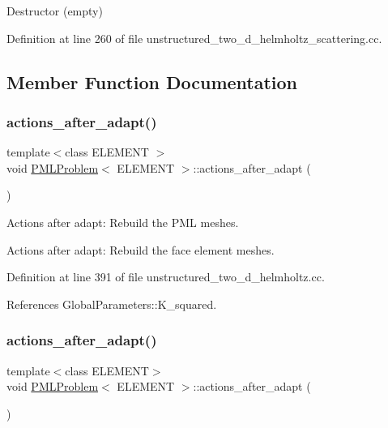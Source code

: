 Destructor (empty) 



Definition at line 260 of file unstructured\+\_\+two\+\_\+d\+\_\+helmholtz\+\_\+scattering.\+cc.



\subsection{Member Function Documentation}
\mbox{\label{classPMLProblem_a732f94d99e7ef65096d6e8d227f9cbc9}} 
\subsubsection{\texorpdfstring{actions\+\_\+after\+\_\+adapt()}{actions\_after\_adapt()}\hspace{0.1cm}{\footnotesize\ttfamily [1/2]}}
{\footnotesize\ttfamily template$<$class E\+L\+E\+M\+E\+NT $>$ \\
void \hyperlink{classPMLProblem}{P\+M\+L\+Problem}$<$ E\+L\+E\+M\+E\+NT $>$\+::actions\+\_\+after\+\_\+adapt (\begin{DoxyParamCaption}{ }\end{DoxyParamCaption})}



Actions after adapt\+: Rebuild the P\+ML meshes. 

Actions after adapt\+: Rebuild the face element meshes. 

Definition at line 391 of file unstructured\+\_\+two\+\_\+d\+\_\+helmholtz.\+cc.



References Global\+Parameters\+::\+K\+\_\+squared.

\mbox{\label{classPMLProblem_a732f94d99e7ef65096d6e8d227f9cbc9}} 
\subsubsection{\texorpdfstring{actions\+\_\+after\+\_\+adapt()}{actions\_after\_adapt()}\hspace{0.1cm}{\footnotesize\ttfamily [2/2]}}
{\footnotesize\ttfamily template$<$class E\+L\+E\+M\+E\+NT$>$ \\
void \hyperlink{classPMLProblem}{P\+M\+L\+Problem}$<$ E\+L\+E\+M\+E\+NT $>$\+::actions\+\_\+after\+\_\+adapt (\begin{DoxyParamCaption}{ }\end{DoxyParamCaption})}



